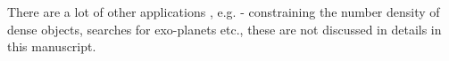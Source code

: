 There are a lot of other applications , e.g. - constraining the number density 
of dense objects, searches
for exo-planets etc., these are not discussed in details in this manuscript. 

